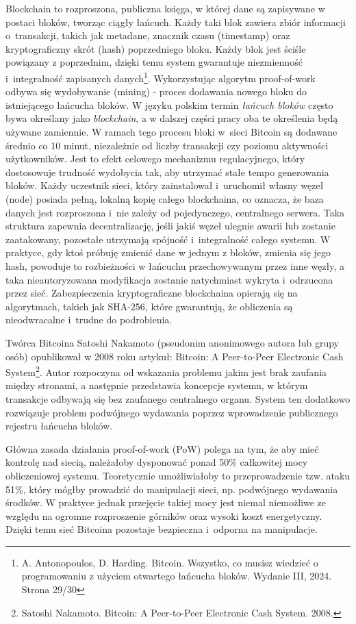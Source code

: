 \documentclass[12pt,a4paper]{report}
\theoremstyle{definition} %
\begin{document}
	Blockchain to rozproszona, publiczna księga, w której dane są zapisywane w postaci bloków, tworząc ciągły łańcuch. Każdy taki blok zawiera zbiór informacji o~transakcji, takich jak metadane, znacznik czasu (timestamp) oraz kryptograficzny skrót (hash) poprzedniego bloku. Każdy blok jest ściśle powiązany z poprzednim, dzięki temu 			system gwarantuje niezmienność i~integralność zapisanych danych\footnote{A. Antonopoulos, D. Harding. Bitcoin. Wszystko, co musisz wiedzieć o programowaniu z użyciem otwartego łańcucha bloków. Wydanie III, 2024. Strona 29/30}. Wykorzystując algorytm proof-of-work odbywa się wydobywanie (mining) - proces dodawania nowego bloku do istniejącego łańcucha bloków. W języku polskim termin \textit{łańcuch bloków} często bywa określany jako \textit{blockchain}, a w dalszej części pracy oba te określenia będą używane zamiennie. W ramach tego procesu bloki w~sieci Bitcoin są dodawane średnio co 10 minut, niezależnie od liczby transakcji czy poziomu aktywności użytkowników. Jest to efekt celowego mechanizmu regulacyjnego, który dostosowuje trudność wydobycia tak, aby utrzymać stałe tempo generowania bloków. Każdy uczestnik sieci, który zainstalował i~uruchomił własny węzeł (node) posiada pełną, lokalną kopię całego blockchaina, co oznacza, że baza danych jest rozproszona i~nie zależy od pojedynczego, centralnego serwera. Taka struktura zapewnia decentralizację, jeśli jakiś węzeł ulegnie awarii lub zostanie zaatakowany, pozostałe utrzymają spójność i~integralność całego systemu. W praktyce, gdy ktoś próbuję zmienić dane w jednym z bloków, zmienia się jego hash, powoduje to rozbieżności w łańcuchu przechowywanym przez inne węzły, a taka nieautoryzowana modyfikacja zostanie natychmiast wykryta i~odrzucona przez sieć. Zabezpieczenia kryptograficzne blockchaina opierają się na algorytmach, takich jak SHA-256, które gwarantują, że obliczenia są nieodwracalne i~trudne do podrobienia.

	Twórca Bitcoina Satoshi Nakamoto (pseudonim anonimowego autora lub grupy osób) opublikował w 2008 roku artykuł: Bitcoin: A Peer-to-Peer Electronic Cash System\footnote{Satoshi Nakamoto. Bitcoin: A Peer-to-Peer Electronic Cash System. 2008.}. Autor rozpoczyna od wskazania problemu jakim jest brak zaufania między stronami, a następnie 			przedstawia koncepcje systemu, w którym transakcje odbywają się bez zaufanego centralnego organu. System ten dodatkowo rozwiązuje problem podwójnego wydawania poprzez wprowadzenie publicznego rejestru łańcucha bloków. 
	
Główna zasada działania proof-of-work (PoW) polega na tym, że aby mieć kontrolę nad siecią, należałoby dysponować ponad 50\% całkowitej mocy obliczeniowej systemu. Teoretycznie umożliwiałoby to przeprowadzenie tzw. ataku 51\%, który mógłby prowadzić do manipulacji sieci, np. podwójnego wydawania środków. W praktyce jednak przejęcie takiej mocy jest niemal niemożliwe ze względu na ogromne rozproszenie górników oraz wysoki koszt energetyczny. Dzięki temu sieć Bitcoina pozostaje bezpieczna i~odporna na manipulacje.
\end{document}

